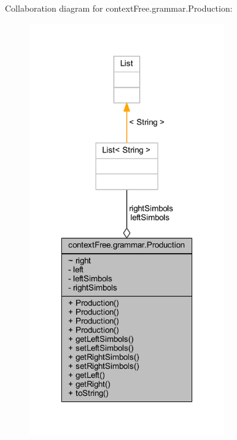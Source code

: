 Collaboration diagram for context\-Free.\-grammar.\-Production\-:\nopagebreak
\begin{figure}[H]
\begin{center}
\leavevmode
\includegraphics[width=238pt]{classcontext_free_1_1grammar_1_1_production__coll__graph}
\end{center}
\end{figure}
